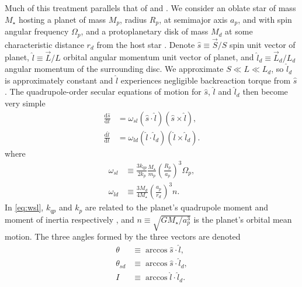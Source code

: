 \documentclass[
        fleqn,
        usenatbib,
        referee,
    ]{mnras}
\newcommand*{\rd}[2]{\frac{\mathrm{d}#1}{\mathrm{d}#2}}
\newcommand*{\p}[1]{\left(#1\right)}
\begin{document}
Much of this treatment parallels that of \citet{anderson2018teeter} and
\citet{millholland_disk}. We consider an oblate star of mass $M_\star$ hosting a
planet of mass $M_p$, radius $R_p$, at semimajor axis $a_p$, and with spin
angular frequency $\Omega_p$, and a protoplanetary disk of mass $M_d$ at some
characteristic distance $r_d$ from the host star \citep[see][for a power-law
disk profile]{millholland_disk}. Denote $\hat{s} \equiv \vec{S} / S$ spin unit
vector of planet, $\hat{l} \equiv \vec{L} / L$ orbital angular momentum unit
vector of planet, and $\hat{l}_d \equiv \vec{L}_d / L_d$ angular momentum of the
surrounding disc. We approximate $S \ll L \ll L_d$, so $\hat{l}_d$ is
approximately constant and $\hat{l}$ experiences negligible backreaction torque
from $\hat{s}$. The quadrupole-order secular equations of motion for $\hat{s}$,
$\hat{l}$ and $\hat{l}_d$ then become very simple
\begin{align}
    \rd{\hat{s}}{t} &= \omega_{sl} \p{\hat{s} \cdot \hat{l}}
        \p{\hat{s} \times \hat{l}},\label{eq:dsdt}\\
    \rd{\hat{l}}{t} &= \omega_{ld}\p{\hat{l} \cdot \hat{l}_d}
        \p{\hat{l} \times \hat{l}_d}\label{eq:dldt}.
\end{align}
where
\begin{align}
    \omega_{sl} &\equiv \frac{3k_{qp}}{2k_p} \frac{M_\star}{m_p}
        \p{\frac{R_p}{a_p}}^3 \Omega_p,\label{eq:wsl}\\
    \omega_{ld} &\equiv \frac{3M_d}{4M_\star}\p{\frac{a_p}{r_d}}^3 n
        .\label{eq:wld}
\end{align}
In \autoref{eq:wsl}, $k_{qp}$ and $k_p$ are related to the planet's quadrupole
moment and moment of inertia respectively \citep[see][]{lai2018}, and $n \equiv
\sqrt{GM_\star/a_p^3}$ is the planet's orbital mean motion. The three angles
formed by the three vectors are denoted
\begin{align}
    \theta &\equiv \arccos \hat{s} \cdot \hat{l},\\
    \theta_{sd} &\equiv \arccos \hat{s} \cdot \hat{l}_d,\\
    I &\equiv \arccos \hat{l} \cdot \hat{l}_d.
\end{align}
\end{document}
